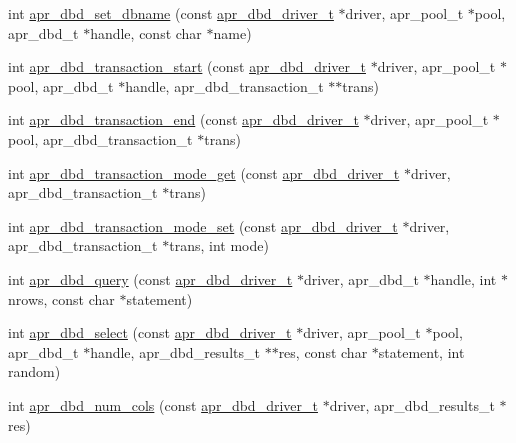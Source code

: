 \begin{DoxyCompactItemize}
\item 
int \hyperlink{group___a_p_r___util___d_b_d_gafecb22f98684f29e579fd73eb58b1e86}{apr\-\_\-dbd\-\_\-set\-\_\-dbname} (const \hyperlink{structapr__dbd__driver__t}{apr\-\_\-dbd\-\_\-driver\-\_\-t} $\ast$driver, apr\-\_\-pool\-\_\-t $\ast$pool, apr\-\_\-dbd\-\_\-t $\ast$handle, const char $\ast$name)
\item 
int \hyperlink{group___a_p_r___util___d_b_d_ga1c401df12087d3bf1f15a9b80a8f572d}{apr\-\_\-dbd\-\_\-transaction\-\_\-start} (const \hyperlink{structapr__dbd__driver__t}{apr\-\_\-dbd\-\_\-driver\-\_\-t} $\ast$driver, apr\-\_\-pool\-\_\-t $\ast$pool, apr\-\_\-dbd\-\_\-t $\ast$handle, apr\-\_\-dbd\-\_\-transaction\-\_\-t $\ast$$\ast$trans)
\item 
int \hyperlink{group___a_p_r___util___d_b_d_ga6f3a5d6b351cd05646c9399a64eafeb5}{apr\-\_\-dbd\-\_\-transaction\-\_\-end} (const \hyperlink{structapr__dbd__driver__t}{apr\-\_\-dbd\-\_\-driver\-\_\-t} $\ast$driver, apr\-\_\-pool\-\_\-t $\ast$pool, apr\-\_\-dbd\-\_\-transaction\-\_\-t $\ast$trans)
\item 
int \hyperlink{group___a_p_r___util___d_b_d_ga2a54cfffc3a348a424002eba937b5853}{apr\-\_\-dbd\-\_\-transaction\-\_\-mode\-\_\-get} (const \hyperlink{structapr__dbd__driver__t}{apr\-\_\-dbd\-\_\-driver\-\_\-t} $\ast$driver, apr\-\_\-dbd\-\_\-transaction\-\_\-t $\ast$trans)
\item 
int \hyperlink{group___a_p_r___util___d_b_d_gab78c0464926311ef64882adfee2f0f42}{apr\-\_\-dbd\-\_\-transaction\-\_\-mode\-\_\-set} (const \hyperlink{structapr__dbd__driver__t}{apr\-\_\-dbd\-\_\-driver\-\_\-t} $\ast$driver, apr\-\_\-dbd\-\_\-transaction\-\_\-t $\ast$trans, int mode)
\item 
int \hyperlink{group___a_p_r___util___d_b_d_ga40dbb6bb3f3f171f3443d21f3594a66a}{apr\-\_\-dbd\-\_\-query} (const \hyperlink{structapr__dbd__driver__t}{apr\-\_\-dbd\-\_\-driver\-\_\-t} $\ast$driver, apr\-\_\-dbd\-\_\-t $\ast$handle, int $\ast$nrows, const char $\ast$statement)
\item 
int \hyperlink{group___a_p_r___util___d_b_d_ga144d354a36140fade933c1ef72661004}{apr\-\_\-dbd\-\_\-select} (const \hyperlink{structapr__dbd__driver__t}{apr\-\_\-dbd\-\_\-driver\-\_\-t} $\ast$driver, apr\-\_\-pool\-\_\-t $\ast$pool, apr\-\_\-dbd\-\_\-t $\ast$handle, apr\-\_\-dbd\-\_\-results\-\_\-t $\ast$$\ast$res, const char $\ast$statement, int random)
\item 
int \hyperlink{group___a_p_r___util___d_b_d_ga77d1bccedee2c61dc96de6852f3a7cc4}{apr\-\_\-dbd\-\_\-num\-\_\-cols} (const \hyperlink{structapr__dbd__driver__t}{apr\-\_\-dbd\-\_\-driver\-\_\-t} $\ast$driver, apr\-\_\-dbd\-\_\-results\-\_\-t $\ast$res)

\end{DoxyCompactItemize}
